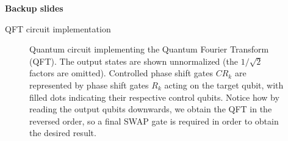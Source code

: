 \begin{frame}
    \centering
    \vspace{1cm}
    {\fontsize{24pt}{24pt}\selectfont \textbf{Backup slides}}
\end{frame}

\begin{frame}{QFT circuit implementation}
    \begin{figure}
\centering
{}


\caption{Quantum circuit implementing the Quantum Fourier Transform (QFT). 
The output states are shown unnormalized (the $1/\sqrt{2}$ factors are omitted). 
Controlled phase shift gates $CR_k$ are represented by phase shift gates $R_k$ acting on the target qubit, 
with filled dots indicating their respective control qubits. Notice how by reading the output qubits downwards, we obtain the QFT in the reversed order, so a final SWAP gate is required in order to obtain the desired result.}
\label{fig:qft}
\end{figure}
\end{frame}


